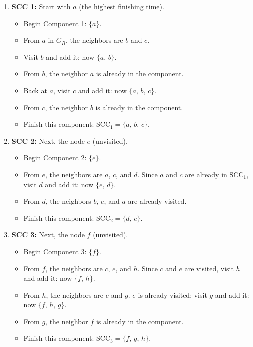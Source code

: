 \documentclass{article}
\begin{document}
\begin{enumerate}[label=\textbf{SCC \arabic*:}]
    \item \textbf{SCC 1:} Start with \(a\) (the highest finishing time).
    \begin{itemize}
        \item Begin Component 1: \(\{a\}\).
        \item From \(a\) in \(G_R\), the neighbors are \(b\) and \(c\).
        \item Visit \(b\) and add it: now \(\{a,\, b\}\).
        \item From \(b\), the neighbor \(a\) is already in the component.
        \item Back at \(a\), visit \(c\) and add it: now \(\{a,\, b,\, c\}\).
        \item From \(c\), the neighbor \(b\) is already in the component.
        \item Finish this component: \(\text{SCC}_1 = \{a,\, b,\, c\}\).
    \end{itemize}
    
    \item \textbf{SCC 2:} Next, the node \(e\) (unvisited).
    \begin{itemize}
        \item Begin Component 2: \(\{e\}\).
        \item From \(e\), the neighbors are \(a\), \(c\), and \(d\). Since \(a\) and \(c\) are already in \(\text{SCC}_1\), visit \(d\) and add it: now \(\{e,\, d\}\).
        \item From \(d\), the neighbors \(b\), \(e\), and \(a\) are already visited.
        \item Finish this component: \(\text{SCC}_2 = \{d,\, e\}\).
    \end{itemize}
    
    \item \textbf{SCC 3:} Next, the node \(f\) (unvisited).
    \begin{itemize}
        \item Begin Component 3: \(\{f\}\).
        \item From \(f\), the neighbors are \(c\), \(e\), and \(h\). Since \(c\) and \(e\) are visited, visit \(h\) and add it: now \(\{f,\, h\}\).
        \item From \(h\), the neighbors are \(e\) and \(g\). \(e\) is already visited; visit \(g\) and add it: now \(\{f,\, h,\, g\}\).
        \item From \(g\), the neighbor \(f\) is already in the component.
        \item Finish this component: \(\text{SCC}_3 = \{f,\, g,\, h\}\).
    \end{itemize}
\end{enumerate}
\end{document}
